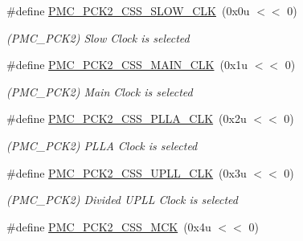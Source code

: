 \begin{DoxyCompactItemize}
\item 
\mbox{\label{group__SAMS70__PMC_ga8adee91878bf416c614f568cd2c58790}} 
\#define \mbox{\hyperlink{group__SAMS70__PMC_ga8adee91878bf416c614f568cd2c58790}{P\+M\+C\+\_\+\+P\+C\+K2\+\_\+\+C\+S\+S\+\_\+\+S\+L\+O\+W\+\_\+\+C\+LK}}~(0x0u $<$$<$ 0)
\begin{DoxyCompactList}\small\item\em (P\+M\+C\+\_\+\+P\+C\+K2) Slow Clock is selected \end{DoxyCompactList}\item 
\mbox{\label{group__SAMS70__PMC_gadf20dcc3c210a9ebd15203388bc56949}} 
\#define \mbox{\hyperlink{group__SAMS70__PMC_gadf20dcc3c210a9ebd15203388bc56949}{P\+M\+C\+\_\+\+P\+C\+K2\+\_\+\+C\+S\+S\+\_\+\+M\+A\+I\+N\+\_\+\+C\+LK}}~(0x1u $<$$<$ 0)
\begin{DoxyCompactList}\small\item\em (P\+M\+C\+\_\+\+P\+C\+K2) Main Clock is selected \end{DoxyCompactList}\item 
\mbox{\label{group__SAMS70__PMC_ga5e7c8d69e0146c86da7bb43bc20ff746}} 
\#define \mbox{\hyperlink{group__SAMS70__PMC_ga5e7c8d69e0146c86da7bb43bc20ff746}{P\+M\+C\+\_\+\+P\+C\+K2\+\_\+\+C\+S\+S\+\_\+\+P\+L\+L\+A\+\_\+\+C\+LK}}~(0x2u $<$$<$ 0)
\begin{DoxyCompactList}\small\item\em (P\+M\+C\+\_\+\+P\+C\+K2) P\+L\+LA Clock is selected \end{DoxyCompactList}\item 
\mbox{\label{group__SAMS70__PMC_gaa06255367c8b2113ce064738c671a161}} 
\#define \mbox{\hyperlink{group__SAMS70__PMC_gaa06255367c8b2113ce064738c671a161}{P\+M\+C\+\_\+\+P\+C\+K2\+\_\+\+C\+S\+S\+\_\+\+U\+P\+L\+L\+\_\+\+C\+LK}}~(0x3u $<$$<$ 0)
\begin{DoxyCompactList}\small\item\em (P\+M\+C\+\_\+\+P\+C\+K2) Divided U\+P\+LL Clock is selected \end{DoxyCompactList}\item 
\mbox{\label{group__SAMS70__PMC_ga95b90d10dab61838f950ba64cfb45306}} 
\#define \mbox{\hyperlink{group__SAMS70__PMC_ga95b90d10dab61838f950ba64cfb45306}{P\+M\+C\+\_\+\+P\+C\+K2\+\_\+\+C\+S\+S\+\_\+\+M\+CK}}~(0x4u $<$$<$ 0)
$$
\end{DoxyCompactItemize}
